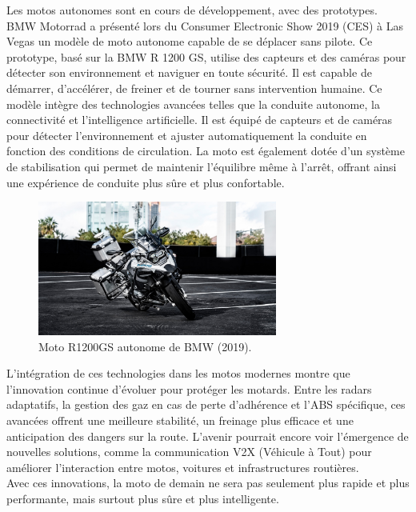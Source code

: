 Les motos autonomes sont en cours de développement, avec des prototypes. BMW Motorrad a présenté lors du Consumer Electronic Show 2019 (CES) à Las Vegas \cite{moto_autonome} un modèle de moto autonome capable de se déplacer sans pilote. Ce prototype, basé sur la BMW R 1200 GS, utilise des capteurs et des caméras pour détecter son environnement et naviguer en toute sécurité. Il est capable de démarrer, d’accélérer, de freiner et de tourner sans intervention humaine. 
Ce modèle intègre des technologies avancées telles que la conduite autonome, la connectivité et l’intelligence artificielle. Il est équipé de capteurs et de caméras pour détecter l’environnement et ajuster automatiquement la conduite en fonction des conditions de circulation. La moto est également dotée d’un système de stabilisation qui permet de maintenir l’équilibre même à l’arrêt, offrant ainsi une expérience de conduite plus sûre et plus confortable.

\begin{figure}[H]
    \centering
    \includegraphics[width=0.7\textwidth]{etat_art/images/bmw.jpeg} 
    \caption{Moto R1200GS autonome de BMW (2019).}
\end{figure}


L’intégration de ces technologies dans les motos modernes montre que l’innovation continue d’évoluer pour protéger les motards. Entre les radars adaptatifs, la gestion des gaz en cas de perte d’adhérence et l’ABS spécifique, ces avancées offrent une meilleure stabilité, un freinage plus efficace et une anticipation des dangers sur la route. L’avenir pourrait encore voir l’émergence de nouvelles solutions, comme la communication V2X (Véhicule à Tout) pour améliorer l’interaction entre motos, voitures et infrastructures routières.\\
Avec ces innovations, la moto de demain ne sera pas seulement plus rapide et plus performante, mais surtout plus sûre et plus intelligente. 

